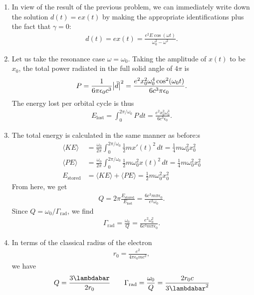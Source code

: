 \documentclass{article}
\theoremstyle{definition}
\newcommand{\f}[2]{\frac{#1}{#2}}
\begin{document}
\begin{enumerate}[label=\alph*)]
	\item In view of the result of the previous problem, we can immediately write down the solution $d(t) = ex(t)$ by making the appropriate identifications plus the fact that $\gamma=0$:
	\begin{align*}
	d(t) = ex(t) = \f{e^2 E\cos(\omega t)}{\omega_0^2 - \omega^2}.
	\end{align*}
	
	\item Let us take the resonance case $\omega = \omega_0$. Taking the amplitude of $x(t)$ to be $x_0$, the total power radiated in the full solid angle of $4\pi$ is 
	\begin{align*}
	P = \f{1}{6\pi \epsilon_0 c^3}\abs{\ddot d}^2 = \f{e^2 x_0^2 \omega_0^4 \cos^2(\omega_0 t)}{6 c^3 \pi \epsilon_0}.
	\end{align*}
	The energy lost per orbital cycle is thus
	\begin{align*}
	E_\text{lost} = \int_0^{2\pi/\omega_0} P\,dt = \f{e^2 x_0^2 \omega_0^3}{6c^3 \epsilon_0}.
	\end{align*}
	
	
	\item The total energy is calculated in the same manner as before:s
	\begin{align*}
	\langle KE\rangle &= \f{\omega_0}{2\pi} \int_0^{2\pi/\omega_0} \f{1}{2}m x'(t)^2\,dt= \f{1}{4}m \omega_0^2 x_0^2  \\
	\langle PE \rangle &= \f{\omega_0}{2\pi}\int_0^{2\pi/\omega_0} \f{1}{2}m \omega_0^2 x(t)^2\,dt  = \f{1}{4}m \omega_0^2 x_0^2 \\
	E_\text{stored} &= \langle KE \rangle + \langle PE \rangle = \f{1}{2}m \omega_0^2 x_0^2
	\end{align*}
	From here, we get
	\begin{align*}
	Q = 2\pi \f{E_\text{stored}}{E_\text{lost}} = \f{6c^3 m\pi \epsilon_0}{e^2 \omega_0}.
	\end{align*}
	Since $Q = \omega_0 / \Gamma_{\text{rad}}$, we find
	\begin{align*}
	\Gamma_\text{rad} = \f{\omega_0}{Q} = \f{e^2 \omega_0^2}{6c^3 m \pi \epsilon_0}.
	\end{align*} 
	
	\item In terms of the classical radius of the electron
	\begin{align*}
	r_0 = \f{e^2}{4\pi \epsilon_0 mc^2}, 
	\end{align*}
	we have
	\begin{align*}
	Q = \f{3\lambdabar}{2r_0} \quad\quad \Gamma_\text{rad} = \f{\omega_0}{Q} = \f{2r_0c}{3\lambdabar^2}
	\end{align*}
	

\end{enumerate}
\end{document}

